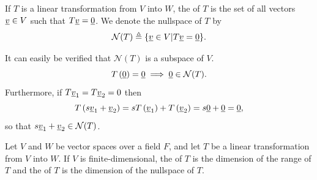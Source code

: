 \begin{definition}
If $T$ is a linear transformation from $V$ into $W$, the  of $T$ is the set of all vectors $\underline{v} \in V$ such that $T \underline{v} = \underline{0}$.
We denote the nullspace of $T$ by
\[ \mathcal{N}(T) \triangleq \{ \underline{v}\in V | T \underline{v} = \underline{0} \} .\]
\end{definition}
It can easily be verified that $\mathcal{N}(T)$ is a subspace of $V$.
\begin{equation*}
T \left( \underline{0} \right) = \underline{0} \implies \underline{0} \in \mathcal{N}(T).
\end{equation*}
Furthermore, if $T \underline{v}_1 = T \underline{v}_2 = 0$ then
\begin{equation*}
T \left( s \underline{v}_1 + \underline{v}_2 \right) = s T \left( \underline{v}_1 \right) + T \left( \underline{v}_2 \right) = s \underline{0} + \underline{0} = \underline{0} ,
\end{equation*}
so that $s \underline{v}_1 + \underline{v}_2 \in \mathcal{N}(T)$.

\begin{definition}
Let $V$ and $W$ be vector spaces over a field $F$, and let $T$ be a linear transformation from $V$ into $W$.
If $V$ is finite-dimensional, the  of $T$ is the dimension of the range of $T$ and the  of $T$ is the dimension of the nullspace of $T$.
\end{definition}

